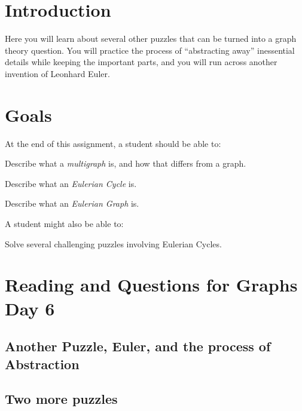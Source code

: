 \documentclass[12pt,letterpaper]{article}
\theoremstyle{definition}
\begin{document}
\setlength{\parskip}{1ex plus 0.5ex minus 0.2ex}
\setlength{\parindent}{0pt}

\pagestyle{fancy}
\cfoot{}

\section*{Introduction}

Here you will learn about several other puzzles that can be turned into a graph theory question. 
You will practice the process of ``abstracting away'' inessential details while keeping the important parts, 
and you will run across another invention of Leonhard Euler.

\section*{Goals}
At the end of this assignment, a student should be able to:
\begin{compactitem}
\item Describe what a \emph{multigraph} is, and how that differs from a graph.
\item Describe what an \emph{Eulerian Cycle} is.
\item Describe what an \emph{Eulerian Graph} is.
\end{compactitem}
A student might also be able to:
\begin{compactitem}
\item Solve several challenging puzzles involving Eulerian Cycles.
\end{compactitem}

\section*{Reading and Questions for Graphs Day 6}

\subsection*{Another Puzzle, Euler, and the process of Abstraction}


\subsection*{Two more puzzles}




\end{document}
